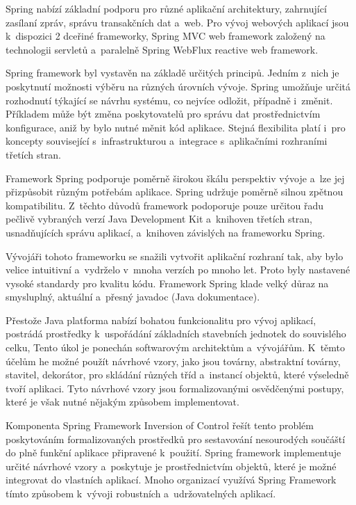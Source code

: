 \documentclass[12pt]{article}
\begin{document}
{Spring nabízí základní podporu pro různé aplikační architektury,
zahrnující zasílaní zpráv, správu transakčních dat a~web.
Pro vývoj webových aplikací jsou k~dispozici 2 dceřiné frameworky,
Spring MVC web framework založený na technologii servletů 
a~paralelně Spring WebFlux reactive web framework.

Spring framework byl vystavěn na základě určitých principů.
Jedním z~nich je poskytnutí možnosti výběru na různých úrovních vývoje.
Spring umožňuje určitá rozhodnutí týkající se návrhu systému, 
co nejvíce odložit, případně i~změnit.
Příkladem může být změna poskytovatelů 
pro správu dat prostřednictvím konfigurace,
aniž by bylo nutné měnit kód aplikace.
Stejná flexibilita platí i~pro koncepty související s~infrastrukturou 
a~integrace s~aplikačními rozhraními třetích stran.

Framework Spring podporuje poměrně širokou škálu perspektiv vývoje
a~lze jej přizpůsobit různým potřebám aplikace.
Spring udržuje poměrně silnou zpětnou kompatibilitu. 
Z~těchto důvodů framework podoporuje pouze určitou řadu
pečlivě vybraných verzí Java Development Kit
a~knihoven třetích stran, usnadňujících správu aplikací,
a~knihoven závislých na frameworku Spring.

Vývojáři tohoto frameworku se snažili vytvořit aplikační rozhraní tak,
aby bylo velice intuitivní a~vydrželo v~mnoha verzích po mnoho let.
Proto byly nastavené vysoké standardy pro kvalitu kódu.
Framework Spring klade velký důraz na smysluplný, aktuální a~přesný javadoc
(Java dokumentace).

Přestože Java platforma nabízí bohatou funkcionalitu pro vývoj aplikací,
postrádá prostředky k~uspořádání základních stavebních jednotek do souvislého celku,
Tento úkol je ponechán softwarovým architektům a~vývojářům.
K~těmto účelům he možné použít návrhové vzory, jako jsou továrny, abstraktní továrny,
stavitel, dekorátor, pro skládání různých tříd a~instancí objektů,
které výseledně tvoří aplikaci.
Tyto návrhové vzory jsou formalizovanými osvědčenými postupy,
které je však nutné nějakým způsobem implementovat.

Komponenta Spring Framework Inversion of Control řešít tento problém
poskytováním formalizovaných prostředků pro sestavování nesourodých
součáští do plně funkční aplikace připravené k~použití.
Spring framework  implementuje určité návrhové vzory a~poskytuje
je prostřednictvím objektů, které je možné integrovat do vlastních aplikací.
Mnoho organizací využívá Spring Framework tímto způsobem k~vývoji robustních
a~udržovatelných aplikací.

}
\end{document}
